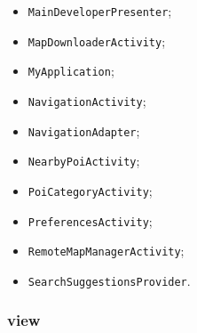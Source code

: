 \documentclass[../DefinizioneDiProdotto.tex]{subfiles}
\begin{document}
\begin{itemize}
\begin{itemize}
		\item \texttt{MainDeveloperPresenter};
		
		\item \texttt{MapDownloaderActivity};
		
		\item \texttt{MyApplication};
		
		\item \texttt{NavigationActivity};
		
		\item \texttt{NavigationAdapter};
		
		\item \texttt{NearbyPoiActivity};
		
		\item \texttt{PoiCategoryActivity};
		
		\item \texttt{PreferencesActivity};
		
		\item \texttt{RemoteMapManagerActivity};
		
		\item \texttt{SearchSuggestionsProvider}.
		
	\end{itemize}
\end{itemize}

\subsubsection{view}
\end{document}
